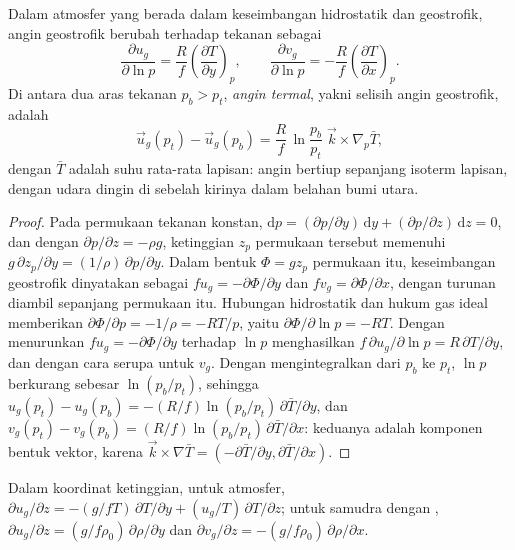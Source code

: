 \begin{theorem}\label{thm:b3:gfd-foundations:thermal-wind}
Dalam atmosfer yang berada dalam keseimbangan hidrostatik dan geostrofik, angin geostrofik
berubah terhadap tekanan sebagai
\[
\frac{\partial u_g}{\partial\ln p} = \frac{R}{f}\left(\frac{\partial T}{\partial y}\right)_p ,
\qquad
\frac{\partial v_g}{\partial\ln p} = -\frac{R}{f}\left(\frac{\partial T}{\partial x}\right)_p .
\]
Di antara dua aras tekanan $p_b > p_t$, \emph{angin
termal}, yakni selisih angin geostrofik, adalah
\[
\vec u_g(p_t) - \vec u_g(p_b) = \frac{R}{f}\,\ln\frac{p_b}{p_t}\;\vec k\times\nabla_p\bar T ,
\]
dengan $\bar T$ adalah suhu rata-rata lapisan: angin bertiup sepanjang
isoterm lapisan, dengan udara dingin di sebelah kirinya dalam
belahan bumi utara.
\end{theorem}

\begin{proof}
Pada permukaan tekanan konstan, $\mathrm dp = (\partial p/\partial y)
\,\mathrm dy + (\partial p/\partial z)\,\mathrm dz = 0$, dan dengan
$\partial p/\partial z = -\rho g$, ketinggian $z_p$ permukaan tersebut memenuhi
$g\,\partial z_p/\partial y = (1/\rho)\,\partial p/\partial y$. Dalam bentuk
 $\Phi = gz_p$ permukaan itu, keseimbangan geostrofik dinyatakan sebagai
$fu_g = -\partial\Phi/\partial y$ dan $fv_g = \partial\Phi/\partial x$, dengan
turunan diambil sepanjang permukaan itu. Hubungan hidrostatik dan
hukum gas ideal memberikan $\partial\Phi/\partial p = -1/\rho = -RT/p$, yaitu
$\partial\Phi/\partial\ln p = -RT$. Dengan menurunkan $fu_g =
-\partial\Phi/\partial y$ terhadap $\ln p$ menghasilkan $f\,\partial
u_g/\partial\ln p = R\,\partial T/\partial y$, dan dengan cara serupa untuk $v_g$.
Dengan mengintegralkan dari $p_b$ ke $p_t$, $\ln p$ berkurang sebesar $\ln(p_b/p_t)$, sehingga
$u_g(p_t) - u_g(p_b) = -(R/f)\ln(p_b/p_t)\,\partial\bar T/\partial y$, dan
$v_g(p_t) - v_g(p_b) = (R/f)\ln(p_b/p_t)\,\partial\bar T/\partial x$: keduanya
adalah komponen bentuk vektor, karena $\vec k\times\nabla\bar T =
(-\partial\bar T/\partial y, \partial\bar T/\partial x)$.
\end{proof}

\begin{corollary}\label{cor:b3:gfd-foundations:thermal-wind-z}
Dalam koordinat ketinggian, untuk atmosfer, $\partial u_g/\partial z =
-(g/fT)\,\partial T/\partial y + (u_g/T)\,\partial T/\partial z$; untuk
samudra dengan , $\partial u_g/\partial z =
(g/f\rho_0)\,\partial\rho/\partial y$ dan $\partial v_g/\partial z =
-(g/f\rho_0)\,\partial\rho/\partial x$.
\end{corollary}

